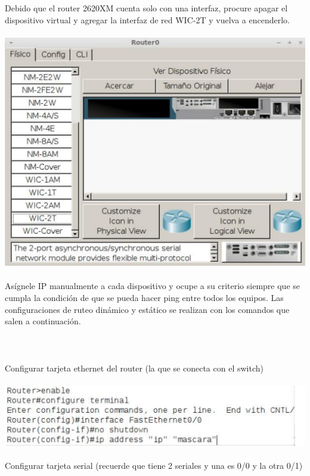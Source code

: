 \documentclass{article}
\begin{document}
Debido que el router 2620XM cuenta solo con una interfaz, procure apagar el dispositivo
virtual y agregar la interfaz de red WIC-2T y vuelva a encenderlo.\\\\

\includegraphics[scale=0.375]{conf.png}\\\\

Asígnele IP manualmente a cada dispositivo y ocupe a su criterio siempre que se cumpla la condición de
que se pueda hacer ping entre todos los equipos. Las configuraciones de ruteo dinámico y estático se realizan
con los comandos que salen a continuación.\\\\\\\\

Configurar tarjeta ethernet del router (la que se conecta con el switch)\\\\

\includegraphics[scale=0.375]{comand1.png}\\\\

Configurar tarjeta serial (recuerde que tiene 2 seriales y una es 0/0 y la otra 0/1)\\\\
\end{document}
